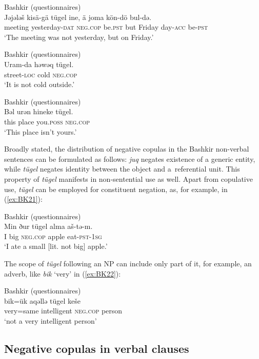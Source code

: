 \documentclass[output=paper,draft,draftmode,colorlinks,citecolor=brown]{langscibook}
\begin{document}
\ea Bashkir (questionnaires) \label{ex:BK18}\\
	\gll Jəjələš	kisä-gä				tügel			ine,		ä		joma    kön-dö	bul-də.\\
	meeting	yesterday-\textsc{dat}		\textsc{neg.cop}		be.\textsc{pst}	but	Friday  day-\textsc{acc}	be-\textsc{pst}\\
	\glt `The meeting was not yesterday, but on Friday.'
\z

\ea Bashkir (questionnaires) \label{ex:BK19}\\
	\gll Uram-da		həwəq	tügel.\\
	street-\textsc{loc}	cold		\textsc{neg.cop}\\
	\glt `It is not cold outside.'
\z

\ea Bashkir (questionnaires) \label{ex:BK20}\\
	\gll Bəl		urən	hineke				tügel.\\
	this	place	you.\textsc{poss}	\textsc{neg.cop}\\
	\glt `This place isn’t yours.'
\z


Broadly stated, the distribution of negative copulas in the Bashkir non-verbal sentences can be formulated as follows: \textit{juq} negates existence of a generic entity, while \textit{tügel} negates identity between the object and a referential unit. This property of \textit{tügel} manifests in non-sentential use as well. Apart from copulative use, \textit{tügel} can be employed for constituent negation, as, for example, in (\ref{ex:BK21}):

\ea Bashkir (questionnaires) \label{ex:BK21}\\
	\gll Min	ður	tügel			alma		aš-tə-m.\\
	I		big	\textsc{neg.cop}		apple		eat-\textsc{pst-1sg}\\
	\glt `I ate a small [lit. not big] apple.'
\z

The scope of \textit{tügel} following an NP can include only part of it, for example, an adverb, like \textit{bik} ‘very’ in (\ref{ex:BK22}):

\ea Bashkir (questionnaires) \label{ex:BK22}\\
	\gll bik=ük		aqəllə		tügel			keše\\
	very=same	intelligent	\textsc{neg.cop}		person\\
	\glt `not a very intelligent person'
\z

\subsection{Negative copulas in verbal clauses}\label{sec:BK2.3}
\end{document}
